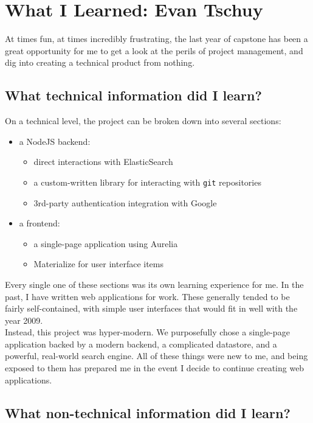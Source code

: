 \documentclass[onecolumn, draftclsnofoot,10pt, compsoc]{IEEEtran}
\begin{document}
\section{What I Learned: Evan Tschuy}

At times fun, at times incredibly frustrating, the last year of capstone has been
a great opportunity for me to get a look at the perils of project management, and
dig into creating a technical product from nothing.

\subsection{What technical information did I learn?}

On a technical level, the project can be broken down into several sections:

\begin{itemize}
	\item a NodeJS backend:
	\begin{itemize}
		\item direct interactions with ElasticSearch
		\item a custom-written library for interacting with \verb|git| repositories
		\item 3rd-party authentication integration with Google
	\end{itemize}
	\item a frontend:
	\begin{itemize}
		\item a single-page application using Aurelia
		\item Materialize for user interface items
	\end{itemize}
\end{itemize}

Every single one of these sections was its own learning experience for me. In the
past, I have written web applications for work. These generally tended to be fairly
self-contained, with simple user interfaces that would fit in well with the year 2009. \\

Instead, this project was hyper-modern. We purposefully chose a single-page application
backed by a modern backend, a complicated datastore, and a powerful, real-world
search engine. All of these things were new to me, and being exposed to them has
prepared me in the event I decide to continue creating web applications.

\subsection{What non-technical information did I learn?}
\end{document}
